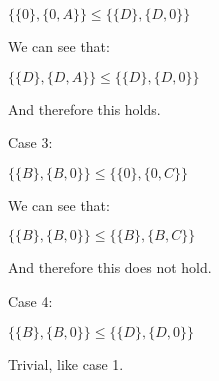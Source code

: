 \(\{\{0\},\{0,A\}\}\le \{\{D\},\{D,0\}\}\)

We can see that:

\(\{\{D\},\{D,A\}\}\le \{\{D\},\{D,0\}\}\)

And therefore this holds.

Case 3:

\(\{\{B\},\{B,0\}\}\le \{\{0\},\{0,C\}\}\)

We can see that:

\(\{\{B\},\{B,0\}\}\le \{\{B\},\{B,C\}\}\)

And therefore this does not hold.

Case 4:

\(\{\{B\},\{B,0\}\}\le \{\{D\},\{D,0\}\}\)

Trivial, like case 1.

